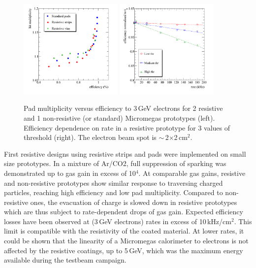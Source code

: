 \begin{figure}
\begin{centering}
\includegraphics[width=0.45\textwidth]{Calorimeter/SDHCAL/splam_eff}
\includegraphics[width=0.45\textwidth]{Calorimeter/SDHCAL/splam_rate}
\caption{Pad multiplicity versus efficiency to 3\,GeV electrons for 2 resistive and 1 non-resistive (or standard) Micromegas prototypes (left). Efficiency dependence on rate in a resistive prototype for 3 values of threshold (right). The electron beam spot is $\sim$\,2$\times$2\,cm$^{2}$.}
\label{resistive}
\end{centering}
\end{figure}


First resistive designs using resistive strips and pads were implemented on small size prototypes. In a mixture of Ar/CO2, full suppression of sparking was demonstrated up to gas gain in excess of 10$^{4}$. At comparable gas gains, resistive and non-resistive prototypes show similar response to traversing charged particles, reaching high efficiency and low pad multiplicity. Compared to non-resistive ones, the evacuation of charge is slowed down in resistive prototypes which are thus subject to rate-dependent drops of gas gain. Expected efficiency losses have been observed at (3\,GeV electrons) rates in excess of 10\,kHz/cm$^{2}$. This limit is compatible with the resistivity of the coated material. At lower rates, it could be shown that the linearity of a Micromegas calorimeter to electrons is not affected by the resistive coatings, up to 5\,GeV, which was the maximum energy available during the testbeam campaign.

